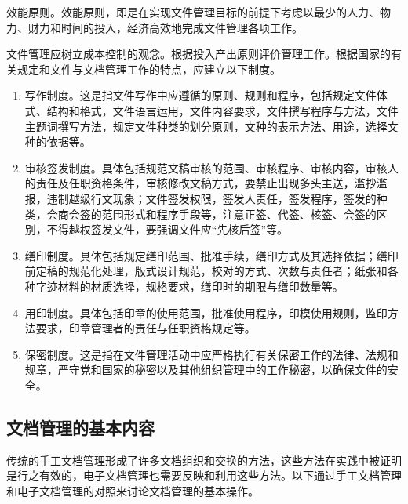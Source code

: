 \begin{enumerate.zh}
        \item 效能原则。效能原则，即是在实现文件管理目标的前提下考虑以最少的人力、物力、财力和时间的投入，经济高效地完成文件管理各项工作。

        文件管理应树立成本控制的观念。根据投入产出原则评价管理工作。根据国家的有关规定和文件与文档管理工作的特点，应建立以下制度。
            \begin{enumerate}
                \item  写作制度。这是指文件写作中应遵循的原则、规则和程序，包括规定文件体式、结构和格式，文件语言运用，文件内容要求，文件撰写程序与方法，文件主题词撰写方法，规定文件种类的划分原则，文种的表示方法、用途，选择文种的依据等。
                \item  审核签发制度。具体包括规范文稿审核的范围、审核程序、审核内容，审核人的责任及任职资格条件，审核修改文稿方式，要禁止出现多头主送，滥抄滥报，违制越级行文现象；文件签发权限，签发人责任，签发程序，签发的种类，会商会签的范围形式和程序手段等，注意正签、代签、核签、会签的区别，不得越权签发文件，要强调文件应“先核后签”等。
                \item  缮印制度。具体包括规定缮印范围、批准手续，缮印方式及其选择依据；缮印前定稿的规范化处理，版式设计规范，校对的方式、次数与责任者；纸张和各种字迹材料的材质选择，规格要求，缮印时的期限与缮印数量等。
                \item  用印制度。具体包括印章的使用范围，批准使用程序，印模使用规则，监印方法要求，印章管理者的责任与任职资格规定等。
                \item  保密制度。这是指在文件管理活动中应严格执行有关保密工作的法律、法规和规章，严守党和国家的秘密以及其他组织管理中的工作秘密，以确保文件的安全。
            \end{enumerate}
    \end{enumerate.zh}

\subsection {文档管理的基本内容}

    传统的手工文档管理形成了许多文档组织和交换的方法，这些方法在实践中被证明是行之有效的，电子文档管理也需要反映和利用这些方法。以下通过手工文档管理和电子文档管理的对照来讨论文档管理的基本操作。

